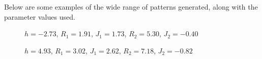 \documentclass[12pt,letterpaper,cm]{article}
\renewcommand{\.}{\cdot}
\newcommand{\<}{\langle}
\renewcommand{\>}{\rangle}
\begin{document}
	Below are some examples of the wide range of patterns generated, along with the parameter values used.
	
	\begin{figure}[hbt]
		\centering
		
		\caption{$h = -2.73$, $R_1 = 1.91$, $J_1 = 1.73$, $R_2 = 5.30$,  $J_2 = -0.40$}
		\label{fig:FastVar}
		
	\end{figure}

	\begin{figure}[hbt]
		\centering
		
		\caption{$h = 4.93$, $R_1 = 3.02$, $J_1 = 2.62$, $R_2 = 7.18$,  $J_2 = -0.82$}
		\label{fig:FastVar}
		
	\end{figure}
\end{document}

